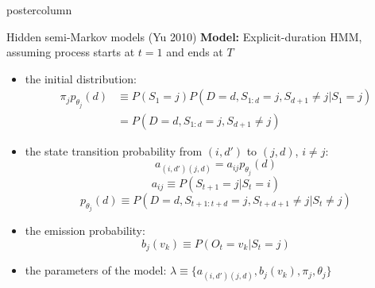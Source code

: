 \documentclass[final,hyperref={pdfpagelabels=false}]{beamer}
\begin{document}
\begin{frame}
\begin{columns}
\begin{column}{.50\textwidth}
\begin{beamercolorbox}[center,wd=\textwidth]{postercolumn}
\begin{minipage}[T]{.98\textwidth}
{\begin{block}{Hidden semi-Markov models (Yu 2010)}
                \vskip0.5cm
                \textbf{Model:} Explicit-duration HMM, assuming process starts at $t=1$ and ends at $T$
                \vskip0cm
                \begin{itemize}
                    \item[\bullet] the initial distribution:
                    {\small
                        \begin{align*}
                            \pi_j p_{\theta_j}(d) & \equiv P(S_1 = j)P(D=d, S_{1:d} = j, S_{d+1} \neq j | S_1 = j)\\
                            & = P(D=d, S_{1:d} = j, S_{d+1} \neq j)
                        \end{align*}
                    }
                    \item[\bullet] the state transition probability from $(i,d')$ to $(j,d)$, $i \neq j$:
                    {\small
                        $$a_{(i,d')(j,d)}=a_{ij}p_{\theta_j}(d)$$
                        $$a_{ij} \equiv P(S_{t+1} = j | S_t = i)$$
                        $$p_{\theta_j}(d) \equiv P(D=d, S_{t+1:t+d} = j, S_{t+d+1} \neq j | S_t \neq j)$$
                    }
                    \item[\bullet] the emission probability:
                    {\small $$b_{j}(v_k) \equiv P(O_t = v_k | S_{t} = j)$$}
                    \item[\bullet] the parameters of the model: $\lambda \equiv \{a_{(i,d')(j,d)},b_{j}(v_{k}), \pi_{j}, \theta_j\}$
                \end{itemize}

            \end{block}
          }
        \end{minipage}
      \end{beamercolorbox}
    \end{column}


\end{columns}
\end{frame}
\end{document}

